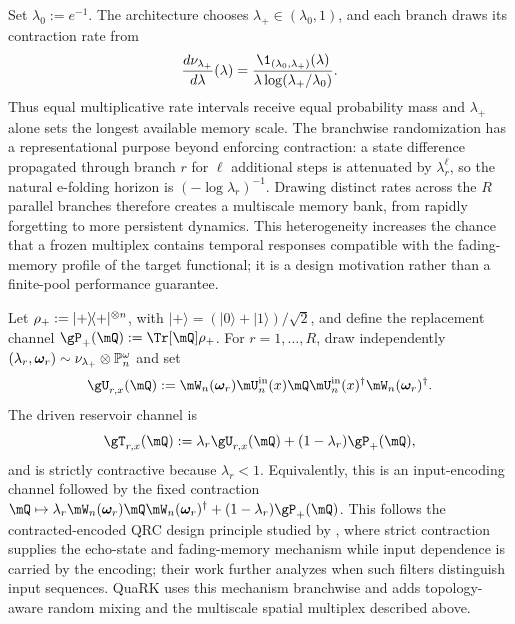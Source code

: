 Set $\lambda_0:=e^{-1}$.  The architecture chooses
$\lambda_+\in(\lambda_0,1)$, and each branch draws its contraction rate from
\begin{equation}
    \frac{d\nu_{\lambda_+}}{d\lambda}(\lambda)
    =\frac{\1_{(\lambda_0,\lambda_+)}(\lambda)}
      {\lambda\log(\lambda_+/\lambda_0)}.
    \label{eq:log-uniform-memory-law}
\end{equation}
Thus equal multiplicative rate intervals receive equal probability mass and
$\lambda_+$ alone sets the longest available memory scale.  The branchwise
randomization has a representational purpose beyond enforcing contraction:
a state difference propagated through branch $r$ for $\ell$ additional steps
is attenuated by $\lambda_r^\ell$, so the natural e-folding horizon is
$(-\log\lambda_r)^{-1}$.  Drawing distinct rates across the $R$ parallel
branches therefore creates a multiscale memory bank, from rapidly forgetting
to more persistent dynamics.  This heterogeneity increases the chance that a
frozen multiplex contains temporal responses compatible with the fading-memory
profile of the target functional; it is a design motivation rather than a
finite-pool performance guarantee.

Let $\rho_{+}:=\lvert+\rangle\!\langle+\rvert^{\otimes n}$, with
$\lvert+\rangle=(\lvert0\rangle+\lvert1\rangle)/\sqrt2$, and define the
replacement channel $\replacementChannel(\mQ):=\Tr[\mQ]\rhoreset$.  For
$r=1,\ldots,R$, draw independently
$(\lambda_r,\boldsymbol{\omega}_r)\sim\nu_{\lambda_+}\otimes\mathbb P_n^\omega$ and set
\[
    \unitaryChannel_{r,x}(\mQ)
    :=\reservoirUnitary_n(\rpar_r)\inputUnitary_n(x)\mQ
      \inputUnitary_n(x)^\dagger\reservoirUnitary_n(\rpar_r)^\dagger.
\]
The driven reservoir channel is
\begin{equation}
    \reservoirChannel_{r,x}(\mQ)
    :=\lambda_r\unitaryChannel_{r,x}(\mQ)
      +(1-\lambda_r)\replacementChannel(\mQ),
    \label{eq:reservoir-channel}
\end{equation}
and is strictly contractive because $\lambda_r<1$.  Equivalently, this is an
input-encoding channel followed by the fixed contraction
$\mQ\mapsto\lambda_r\reservoirUnitary_n(\rpar_r)\mQ
\reservoirUnitary_n(\rpar_r)^\dagger+(1-\lambda_r)\replacementChannel(\mQ)$.
This follows the contracted-encoded QRC design principle studied by
\citet{MartinezPenaOrtega2025}, where strict contraction supplies the echo-state
and fading-memory mechanism while input dependence is carried by the encoding;
their work further analyzes when such filters distinguish input sequences.
QuaRK uses this mechanism branchwise and adds topology-aware random mixing and
the multiscale spatial multiplex described above.


